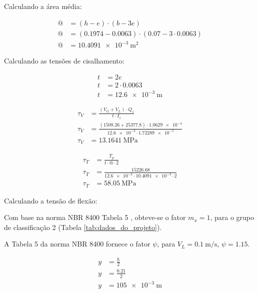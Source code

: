 Calculando a área média:

\begin{align*}
  @ & = \left( h - e \right) \cdot \left( b - 3 e \right)                                                 \\
  @ & = \left( \num{0.1974} - \num{0.0063} \right) \cdot \left( \num{0.07} - 3 \cdot \num{0.0063} \right) \\
  @ & = \boxed{\SI{10.4091e-3}{\meter^2}}
\end{align*}

Calculando as tensões de cisalhamento:

\begin{align*}
  t & = 2e                           \\
  t & = 2 \cdot \num{0.0063}         \\
  t & = \boxed{\SI{12.6e-3}{\meter}}
\end{align*}

\begin{align*}
  \tau_V & = \frac{\left( V_G + V_L \right) \cdot Q_z}{t \cdot I_z}                                                          \\
  \tau_V & = \frac{\left( \num{1508.26} + \num{25377.8} \right) \cdot \num{1.0629e-4}}{\num{12.6e-3} \cdot \num{1.72289e-5}} \\
  \tau_V & = \boxed{\SI{13.1641}{\mega\pascal}}
\end{align*}

\begin{align*}
  \tau_T & = \frac{T_p}{t \cdot @ \cdot 2}                                       \\
  \tau_T & = \frac{\num{15226.68}}{\num{12.6e-3} \cdot \num{10.4091e-3} \cdot 2} \\
  \tau_T & = \boxed{\SI{58.05}{\mega\pascal}}
\end{align*}

Calculando a tensão de flexão:

Com base na norma NBR 8400 Tabela 5 \cite{nbr8400}, obteve-se o fator $m_x = 1$, para o grupo de classificação 2 (Tabela \ref{tab:dados_do_projeto}).

A Tabela 5 da norma NBR 8400 \cite{nbr8400} fornece o fator $\psi$, para $V_L = \SI{0.1}{\meter\per\second}$, $\psi = \num{1.15}$.

\begin{align*}
  y & = \frac{h}{2}                 \\
  y & = \frac{\num{0.21}}{2}        \\
  y & = \boxed{\SI{105e-3}{\meter}}
\end{align*}

